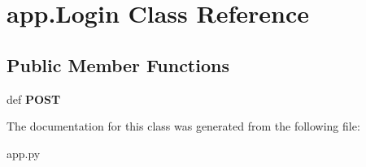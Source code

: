 \hypertarget{classapp_1_1_login}{\section{app.\+Login Class Reference}
\label{classapp_1_1_login}
}
\subsection*{Public Member Functions}
\begin{DoxyCompactItemize}
\item 
\hypertarget{classapp_1_1_login_ac14b029037d7d4fc20cbdc5fcb0be75a}{def {\bfseries P\+O\+S\+T}}\label{classapp_1_1_login_ac14b029037d7d4fc20cbdc5fcb0be75a}

\end{DoxyCompactItemize}


The documentation for this class was generated from the following file\+:\begin{DoxyCompactItemize}
\item 
app.\+py\end{DoxyCompactItemize}
